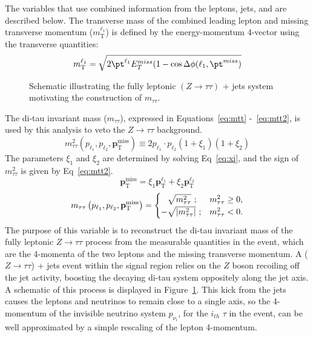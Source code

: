 The variables that use combined information from the leptons, jets, and \met{} are described below.  The transverse mass of the combined leading lepton and missing transverse momentum ($m_\text{T}^{\ell_1}$) is defined by the energy-momentum 4-vector using the transverse quantities:
\begin{equation}
\label{eq:mt}
m_\mathrm{T}^{\ell_1} = \sqrt{2\pt^{\ell_1}E^{miss}_T(1-\cos\Delta\phi(\ell_1,\pt^{miss})} 
\end{equation}
   \begin{figure}
  \centering
  
  \caption{Schematic illustrating the fully leptonic $(Z\to\tau\tau)$ + jets system motivating the construction of $m_{\tau\tau}$. }
  \label{fig:ditau_schematic}
  \end{figure}
The di-tau invariant mass ($m_{\tau\tau}$), expressed in Equations~\ref{eq:mtt} -~\ref{eq:mtt2}, is used by this analysis to veto the $Z\rightarrow\tau\tau$ background. 
 \begin{equation}
 \label{eq:mtt}
 m^2_{\tau\tau}\left(p_{\ell_1}, p_{\ell_2}, \mathbf{p}_\mathrm{T}^\mathrm{miss}\right) \equiv 2p_{\ell_1}\cdot p_{\ell_2}(1+\xi_1)(1+\xi_2)
 \end{equation}
 The parameters $\xi_1$ and $\xi_2$ are determined by solving Eq~\ref{eq:xi}, and the sign of $m^2_{\tau\tau}$ is given by Eq~\ref{eq:mtt2}.
  \begin{equation}
   \label{eq:xi}
  \mathbf{p}_\mathrm{T}^\mathrm{miss} = \xi_1\mathbf{p}_\mathrm{T}^\mathrm{\ell_1}+\xi_2\mathbf{p}_\mathrm{T}^\mathrm{\ell_2}
   \end{equation}
 \begin{equation}
 \label{eq:mtt2}
 m_{\tau\tau}\left(p_{\ell_1}, p_{\ell_2}, \mathbf{p}_\mathrm{T}^\mathrm{miss}\right) =
\begin{cases}
\hphantom{-}\sqrt{m_{\tau\tau}^2}~;               & m_{\tau\tau}^2 \geq 0,\\
 -\sqrt{\left| m_{\tau\tau}^2\right|}~; & m_{\tau\tau}^2 < 0.
\end{cases} 
 \end{equation} 
 The purpose of this variable is to reconstruct the di-tau invariant mass of the fully leptonic $Z\rightarrow\tau\tau$ process from the measurable quantities in the event, which are the 4-momenta of the two leptons and the missing transverse momentum.  A ($Z\rightarrow\tau\tau$) + jets event within the signal region relies on the $Z$ boson recoiling off the jet activity, boosting the decaying di-tau system oppositely along the jet axis.  A schematic of this process is displayed in Figure~\ref{fig:ditau_schematic}.  This kick from the jets causes the leptons and neutrinos to remain close to a single axis, so the 4-momentum of the invisible neutrino system $p_{\nu_i}$, for the $i_{th}$ $\tau$ in the event, can be well approximated by a simple rescaling of the lepton 4-momentum.  
 
